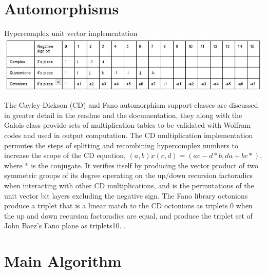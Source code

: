 \documentclass[11pt]{article}
\begin{document}
\section{Automorphisms}
\begin{center}
Hypercomplex unit vector implementation
\includegraphics{unitVectorChart.jpg}\\
\end{center}

The Cayley-Dickson (CD) and Fano automorphism support classes are discussed in greater detail in the readme and the documentation, they along with the Galois class provide sets of multiplication tables to be validated with Wolfram codes and used in output computation. The CD multiplication implementation permutes the steps of splitting and recombining hypercomplex numbers to increase the scope of the CD equation, $(a,b)x(c,d)=(ac-d*b,da+bc*)$, where * is the conjugate. It verifies itself by producing the vector product of two symmetric groups of its degree operating on the up/down recursion factoradics when interacting with other CD multiplications, and is the permutations of the unit vector bit layers excluding the negative sign. The Fano library octonions produce a triplet that is a linear match to the CD octonions as triplets 0 when the up and down recursion factoradics are equal, and produce the triplet set of John Baez's Fano plane as triplets{10}. \cite{Baez}.

\section{Main Algorithm}
\end{document}
